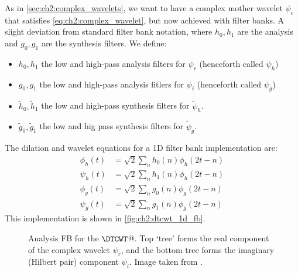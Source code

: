   As in \autoref{sec:ch2:complex_wavelets}, we want to have a complex mother
  wavelet $\psi_c$ that satisfies \eqref{eq:ch2:complex_wavelet}, but now
  achieved with filter banks. A slight deviation from standard filter bank
  notation, where $h_0, h_1$ are the analysis and $g_0,g_1$ are the synthesis
  filters. We define:
  \begin{itemize}
    \item $h_0, h_1$ the low and high-pass analysis filters for $\psi_r$ (henceforth called
      $\psi_h$)
    \item $g_0, g_1$ the low and high-pass analysis fitlers for $\psi_i$
      (henceforth called $\psi_g$)
    \item $\tilde{h}_0, \tilde{h}_1$ the low and high-pass synthesis filters
      for $\tilde{\psi}_h$.
    \item $\tilde{g}_0, \tilde{g}_1$ the low and hig pass synthesis filters for
      $\tilde{\psi}_g$.
  \end{itemize}

  The dilation and wavelet equations for a 1D filter bank implementation are:
  \begin{align}
    \phi_h(t) & =  \sqrt{2} \sum_n h_0(n) \phi_h(2t-n) \\
    \psi_h(t) & =  \sqrt{2} \sum_n h_1(n) \phi_h(2t-n) \\
    \phi_g(t) & =  \sqrt{2} \sum_n g_0(n) \phi_g(2t-n) \\
    \psi_g(t) & =  \sqrt{2} \sum_n g_1(n) \phi_g(2t-n) 
  \end{align}
  This implementation is shown in \autoref{fig:ch2:dtcwt_1d_fb}.

  \begin{figure}
    \centering
      \caption[Analysis FB for the $\DTCWT$]
              {Analysis FB for the $\DTCWT$@. Top `tree' forms the real
              component of the complex wavelet $\psi_r$, and the bottom tree forms the
              imaginary (Hilbert pair) component $\psi_i$. Image taken from
              \cite{selesnick_dual-tree_2005}.}
      \label{fig:ch2:dtcwt_1d_fb}
  \end{figure}

